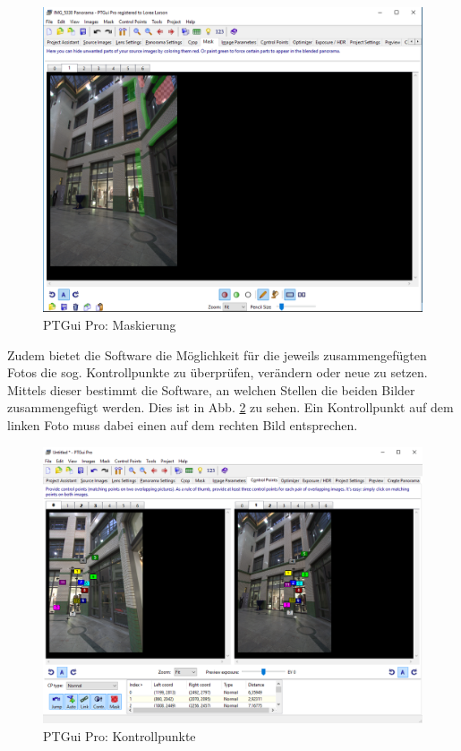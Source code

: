 \documentclass[liststotoc,bibtotoc,fontsize=14pt,]{scrreprt}
\begin{document}
	\begin{figure}[H]
		\includegraphics[width=\linewidth]{img/steps/PTGui_Step_4_1.PNG}
		\caption{PTGui Pro: Maskierung}
		\label{img:ptgui_step_4_1}
	\end{figure}
	\bigskip
	Zudem bietet die Software die Möglichkeit für die jeweils zusammengefügten Fotos die sog. Kontrollpunkte zu überprüfen, verändern oder neue zu setzen. Mittels dieser bestimmt die Software, an welchen Stellen die beiden Bilder zusammengefügt werden. Dies ist in Abb. \ref{img:ptgui_step_5} zu sehen. Ein Kontrollpunkt auf dem linken Foto muss dabei einen auf dem rechten Bild entsprechen.
	\begin{figure}[H]
		\includegraphics[width=\linewidth]{img/steps/PTGui_Step_5.PNG}
		\caption{PTGui Pro: Kontrollpunkte}
		\label{img:ptgui_step_5}
	\end{figure}
\end{document}
